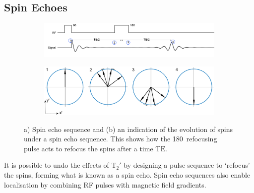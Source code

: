\subsection{Spin Echoes}
\label{sec:spin_echoes}
\begin{figure}
	\centering
	\begin{subfigure}{0.9\textwidth}
		\includegraphics[width = \textwidth]{figures/background/spinecho.png}
		\caption{}
		\label{fig:spinechosequence}
	\end{subfigure}
	
	\begin{subfigure}{0.9\textwidth}
		\includegraphics[width = \textwidth]{figures/background/spinecho_evolution.eps}
		\caption{}
		\label{fig:spinecho_evolution}
	\end{subfigure}

	\caption{a) Spin echo sequence and (b) an indication of the evolution of spins under a spin echo sequence. This shows how the 180\degree\ refocusing pulse acts to refocus the spins after a time $\mathrm{TE}$.}
	\label{fig:spinecho}
\end{figure}
It is possible to undo the effects of $\mathrm{T}_2'$ by designing a pulse sequence to `refocus' the spins, forming what is known as a spin echo.
Spin echo sequences also enable localisation by combining \ac{RF} pulses with magnetic field gradients.

